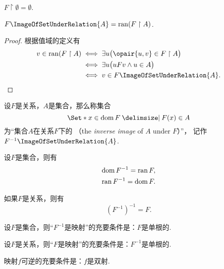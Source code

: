 \begin{theorem}
\(F \upharpoonright \emptyset = \emptyset\).
\end{theorem}

\begin{theorem}
\(F\ImageOfSetUnderRelation{A} = \ran(F \upharpoonright A)\).
\begin{proof}
根据值域的定义有\begin{align*}
	v \in \ran(F \upharpoonright A)
	&\iff
	\exists u \bigl( \opair{u,v} \in F \upharpoonright A \bigr) \\
	&\iff
	\exists u \bigl( u F v \land u \in A \bigr) \\
	&\iff
	v \in F\ImageOfSetUnderRelation{A}.
	\qedhere
\end{align*}
\end{proof}
\end{theorem}

\begin{definition}
设\(F\)是关系，\(A\)是集合，那么称集合\[
	\Set*{ x \in \dom F \given F(x) \in A }
\]为“集合\(A\)在关系\(F\)下的%
（the \emph{inverse image} of \(A\) under \(F\)）”，
记作\(F^{-1}\ImageOfSetUnderRelation{A}\).
\end{definition}

\begin{theorem}\label{theorem:集合论.关系的逆的定义域值域以及关系的二重逆}
设\(F\)是集合，则有\begin{gather}
	\operatorname{dom} F^{-1} = \operatorname{ran} F, \\
	\operatorname{ran} F^{-1} = \operatorname{dom} F.
\end{gather}

如果\(F\)是关系，则有\begin{equation}
	(F^{-1})^{-1} = F.
\end{equation}
\end{theorem}

\begin{theorem}\label{theorem:集合论.关系及其逆是映射的充要条件}
设\(F\)是集合，则“\(F^{-1}\)是映射”的充要条件是：\(F\)是单根的.

设\(F\)是关系，则“\(F\)是映射”的充要条件是：\(F^{-1}\)是单根的.
\end{theorem}

\begin{theorem}\label{theorem:集合论.映射可逆的充要条件}
映射\(f\)可逆的充要条件是：\(f\)是双射.
\end{theorem}

